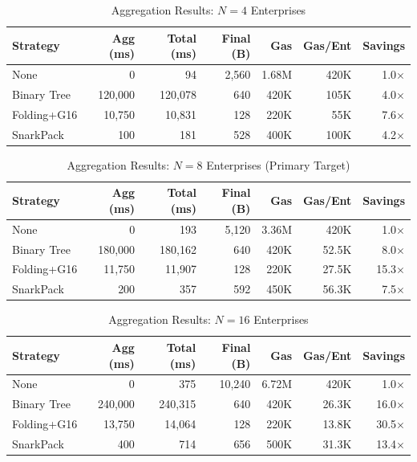 \begin{table}[htbp]
\centering
\caption{Aggregation Results: $N{=}4$ Enterprises}
\label{tab:n4}
\begin{tabular}{@{}lrrrrrr@{}}
\toprule
\textbf{Strategy} & \textbf{Agg (ms)} & \textbf{Total (ms)} & \textbf{Final (B)} & \textbf{Gas} & \textbf{Gas/Ent} & \textbf{Savings} \\
\midrule
None          & 0       & 94      & 2,560 & 1.68M & 420K & 1.0$\times$ \\
Binary Tree   & 120,000 & 120,078 & 640   & 420K  & 105K & 4.0$\times$ \\
Folding+G16   & 10,750  & 10,831  & 128   & 220K  & 55K  & 7.6$\times$ \\
SnarkPack     & 100     & 181     & 528   & 400K  & 100K & 4.2$\times$ \\
\bottomrule
\end{tabular}
\end{table}

\begin{table}[htbp]
\centering
\caption{Aggregation Results: $N{=}8$ Enterprises (Primary Target)}
\label{tab:n8}
\begin{tabular}{@{}lrrrrrr@{}}
\toprule
\textbf{Strategy} & \textbf{Agg (ms)} & \textbf{Total (ms)} & \textbf{Final (B)} & \textbf{Gas} & \textbf{Gas/Ent} & \textbf{Savings} \\
\midrule
None          & 0       & 193     & 5,120 & 3.36M & 420K   & 1.0$\times$ \\
Binary Tree   & 180,000 & 180,162 & 640   & 420K  & 52.5K  & 8.0$\times$ \\
Folding+G16   & 11,750  & 11,907  & 128   & 220K  & 27.5K  & 15.3$\times$ \\
SnarkPack     & 200     & 357     & 592   & 450K  & 56.3K  & 7.5$\times$ \\
\bottomrule
\end{tabular}
\end{table}

\begin{table}[htbp]
\centering
\caption{Aggregation Results: $N{=}16$ Enterprises}
\label{tab:n16}
\begin{tabular}{@{}lrrrrrr@{}}
\toprule
\textbf{Strategy} & \textbf{Agg (ms)} & \textbf{Total (ms)} & \textbf{Final (B)} & \textbf{Gas} & \textbf{Gas/Ent} & \textbf{Savings} \\
\midrule
None          & 0       & 375     & 10,240 & 6.72M & 420K   & 1.0$\times$ \\
Binary Tree   & 240,000 & 240,315 & 640    & 420K  & 26.3K  & 16.0$\times$ \\
Folding+G16   & 13,750  & 14,064  & 128    & 220K  & 13.8K  & 30.5$\times$ \\
SnarkPack     & 400     & 714     & 656    & 500K  & 31.3K  & 13.4$\times$ \\
\bottomrule
\end{tabular}
\end{table}

